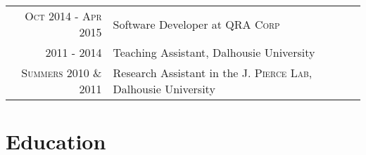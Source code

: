 \documentclass[a4paper,11pt]{article} %
\begin{document}
\begin{tabular}{r|p{11cm}}
\textsc{Oct 2014 - Apr 2015} & Software Developer at \textsc{QRA Corp}\\
\textsc{ 2011 - 2014 } & Teaching Assistant, Dalhousie University \\
\textsc{Summers 2010 \& 2011} & Research Assistant in the \textsc{J. Pierce Lab}, Dalhousie University  \\




\end{tabular}


\section{Education}
\end{document}
